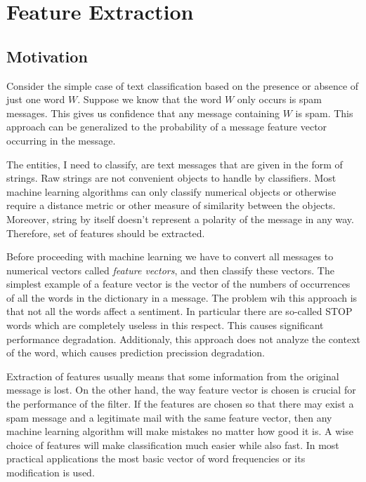\documentclass[12pt]{report}
\begin{document}
\chapter{Feature Extraction}

\section{Motivation}

Consider the simple case of text classification based on the presence or absence of just one word $W$. Suppose we know that the word $W$ only occurs is spam messages. This gives us confidence that any message containing $W$ is spam. This approach can be generalized to the probability of a message feature vector occurring in the message.

The entities, I need to classify, are text messages that are given in the form of strings. Raw strings are not convenient objects to handle by classifiers. Most machine learning algorithms can only classify numerical objects or otherwise require a distance metric or other measure of similarity between the objects. Moreover, string by itself doesn't represent a polarity of the message in any way. Therefore, set of features should be extracted.

Before proceeding with machine learning we have to convert all messages to numerical vectors called \textit{feature vectors}, and then classify these vectors. The simplest example of a feature vector is the vector of the numbers of occurrences of all the words in the dictionary in a message. The problem wih this approach is that not all the words affect a sentiment. In particular there are so-called STOP words which are completely useless in this respect. This causes significant performance degradation. Additionaly, this approach does not analyze the context of the word, which causes prediction precission degradation.

Extraction of features usually means that some information from the original message is lost. On the other hand, the way feature vector is chosen is crucial for the performance of the filter. If the features are chosen so that there may exist a spam message and a legitimate mail with the same feature vector, then any machine learning algorithm will make mistakes no matter how good it is. A wise choice of features will make classification much easier while also fast. In most practical applications the most basic vector of word frequencies or its modification is used.
\end{document}
